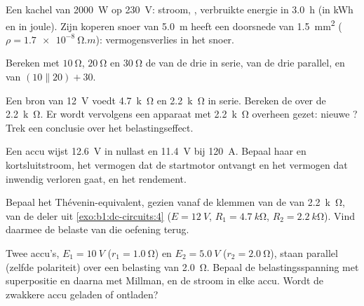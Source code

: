 \begin{exercise}[$\star$]\label{exo:b1:dc-circuits:2}
Een kachel van \qty{2000}{W} op \qty{230}{V}: stroom, , verbruikte
energie in \qty{3.0}{h} (in kWh en in joule). Zijn koperen snoer van
\qty{5.0}{m} heeft een doorsnede van \qty{1.5}{mm^2} ($\rho = \qty{1.7e-8}{\ohm.m}$):
vermogensverlies in het snoer.
\end{exercise}

\begin{exercise}[$\star$]\label{exo:b1:dc-circuits:3}
Bereken met $\qty{10}{\ohm}$, $\qty{20}{\ohm}$ en $\qty{30}{\ohm}$
de  van de drie in serie, van de drie parallel, en van
$(10 \parallel 20) + 30$.
\end{exercise}

\begin{exercise}[$\star$]\label{exo:b1:dc-circuits:4}
Een bron van \qty{12}{V} voedt \qty{4.7}{k\ohm} en \qty{2.2}{k\ohm} in
serie. Bereken de  over de \qty{2.2}{k\ohm}. Er wordt vervolgens een
apparaat met  \qty{2.2}{k\ohm} overheen gezet: nieuwe ?
Trek een conclusie over het belastingseffect.
\end{exercise}

\begin{exercise}[$\star\star$]\label{exo:b1:dc-circuits:5}
Een accu wijst \qty{12.6}{V} in nullast en \qty{11.4}{V} bij
\qty{120}{A}. Bepaal haar  en kortsluitstroom,
het vermogen dat de startmotor ontvangt en het vermogen dat inwendig verloren
gaat, en het rendement.
\end{exercise}

\begin{exercise}[$\star\star$]\label{exo:b1:dc-circuits:6}
Bepaal het Thévenin-equivalent, gezien vanaf de klemmen van de
 van \qty{2.2}{k\ohm}, van de deler uit \cref{exo:b1:dc-circuits:4}
($E = \qty{12}{V}$, $R_1 = \qty{4.7}{k\ohm}$, $R_2 = \qty{2.2}{k\ohm}$).
Vind daarmee de belaste  van die oefening terug.
\end{exercise}

\begin{exercise}[$\star\star$]\label{exo:b1:dc-circuits:7}
Twee accu's, $E_1 = \qty{10}{V}$ ($r_1 = \qty{1.0}{\ohm}$) en
$E_2 = \qty{5.0}{V}$ ($r_2 = \qty{2.0}{\ohm}$), staan parallel (zelfde
polariteit) over een belasting van \qty{2.0}{\ohm}. Bepaal de
belastingsspanning met superpositie en daarna met Millman, en de stroom in elke
accu. Wordt de zwakkere accu geladen of ontladen?
\end{exercise}

